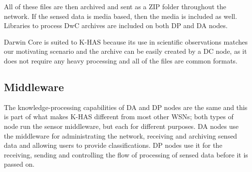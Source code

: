 
% 


% 


All of these files are then archived and sent as a ZIP folder throughout the network. If the sensed data is media based, then the media is included as well. Libraries to process DwC archives are included on both DP and DA nodes.

Darwin Core is suited to K-HAS because its use in scientific observations matches our motivating scenario and the archive can be easily created by a DC node, as it does not require any heavy processing and all of the files are common formats.
	
	\subsection{Middleware}
	The knowledge-processing capabilities of DA and DP nodes are the same and this is part of what makes K-HAS different from most other WSNs; both types of node run the sensor middleware, but each for different purposes. DA nodes use the middleware for administrating the network, receiving and archiving sensed data and allowing users to provide classifications. DP nodes use it for the receiving, sending and controlling the flow of processing of sensed data before it is passed on.
	
